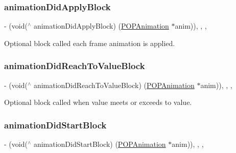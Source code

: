 \subsubsection{\texorpdfstring{animation\+Did\+Apply\+Block}{animationDidApplyBlock}}
{\footnotesize\ttfamily -\/ (void($^\wedge$ animation\+Did\+Apply\+Block) (\mbox{\hyperlink{interface_p_o_p_animation}{P\+O\+P\+Animation}} $\ast$anim))\hspace{0.3cm}{\ttfamily [read]}, {\ttfamily [write]}, {\ttfamily [nonatomic]}, {\ttfamily [copy]}}

Optional block called each frame animation is applied. \mbox{\label{interface_p_o_p_animation_adc69ed91e734a83006e8be24c0f9c2ac}} 
\subsubsection{\texorpdfstring{animation\+Did\+Reach\+To\+Value\+Block}{animationDidReachToValueBlock}}
{\footnotesize\ttfamily -\/ (void($^\wedge$ animation\+Did\+Reach\+To\+Value\+Block) (\mbox{\hyperlink{interface_p_o_p_animation}{P\+O\+P\+Animation}} $\ast$anim))\hspace{0.3cm}{\ttfamily [read]}, {\ttfamily [write]}, {\ttfamily [nonatomic]}, {\ttfamily [copy]}}

Optional block called when value meets or exceeds to value. \mbox{\label{interface_p_o_p_animation_aa014835f374d509dbb6b0ee1985e3523}} 
\subsubsection{\texorpdfstring{animation\+Did\+Start\+Block}{animationDidStartBlock}}
{\footnotesize\ttfamily -\/ (void($^\wedge$ animation\+Did\+Start\+Block) (\mbox{\hyperlink{interface_p_o_p_animation}{P\+O\+P\+Animation}} $\ast$anim))\hspace{0.3cm}{\ttfamily [read]}, {\ttfamily [write]}, {\ttfamily [nonatomic]}, {\ttfamily [copy]}}

